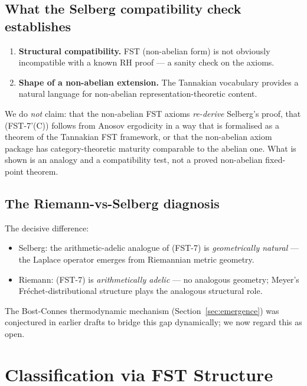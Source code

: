 \documentclass[11pt,a4paper]{article}
\theoremstyle{plain}
\theoremstyle{definition}
\begin{document}
\subsection{What the Selberg compatibility check establishes}

\begin{enumerate}[leftmargin=*]
\item \textbf{Structural compatibility.}  FST (non-abelian form) is
  not obviously incompatible with a known RH proof --- a sanity
  check on the axioms.
\item \textbf{Shape of a non-abelian extension.}  The Tannakian
  vocabulary provides a natural language for non-abelian
  representation-theoretic content.
\end{enumerate}

We do \emph{not} claim: that the non-abelian FST axioms
\emph{re-derive} Selberg's proof, that (FST-7'(C)) follows from
Anosov ergodicity in a way that is formalised as a theorem of the
Tannakian FST framework, or that the non-abelian axiom package has
category-theoretic maturity comparable to the abelian one.  What is
shown is an analogy and a compatibility test, not a proved
non-abelian fixed-point theorem.

\subsection{The Riemann-vs-Selberg diagnosis}

The decisive difference:
\begin{itemize}
\item Selberg: the arithmetic-adelic analogue of (FST-7) is
  \emph{geometrically natural} --- the Laplace operator emerges from
  Riemannian metric geometry.
\item Riemann: (FST-7) is \emph{arithmetically adelic} --- no
  analogous geometry; Meyer's Fr\'echet-distributional structure
  plays the analogous structural role.
\end{itemize}

The Bost-Connes thermodynamic mechanism (Section~\ref{sec:emergence})
was conjectured in earlier drafts to bridge this gap dynamically;
we now regard this as open.

\section{Classification via FST Structure}
\label{sec:classification}
\end{document}
